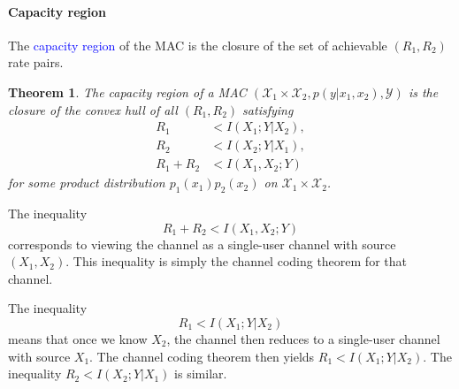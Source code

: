 \documentclass[a4paper, 11pt, openany]{book}
\numberwithin{equation}{section}
\theoremstyle{plain}
\newtheorem{theorem}	[equation]	{Theorem}
\theoremstyle{definition}
\newcommand{\Structure}[1]{\textcolor{blue}{#1}}
\newcommand{\alphabet}[1]{\mathcal{#1}}
\begin{document}
\paragraph{Capacity region}
The \Structure{capacity region} of the MAC is the closure of the set of achievable $(R_1, R_2)$ rate pairs.

\begin{theorem}
The capacity region of a MAC $( \alphabet{X}_1 \times \alphabet{X}_2 , p(y | x_1, x_2), \alphabet{Y} )$ is the closure of the convex hull of all $(R_1, R_2)$ satisfying
\begin{align*}
	R_1 &< I(X_1 ; Y | X_2),\\
	R_2 &< I(X_2 ; Y | X_1),\\
	R_1 + R_2 &< I(X_1, X_2 ; Y)
\end{align*}
for some product distribution $p_1(x_1) p_2(x_2)$ on $\alphabet{X}_1 \times \alphabet{X}_2$.
\end{theorem}


\begin{center}
\end{center}


The inequality
\[
	R_1 + R_2 < I(X_1, X_2 ; Y)
\]
corresponds to viewing the channel as a single-user channel with source $(X_1, X_2)$. This inequality is simply  the channel coding theorem for that channel.

The inequality
\[
	R_1 < I(X_1; Y | X_2)
\]
means that once we know $X_2$, the channel then reduces to a single-user channel with source $X_1$. The channel coding theorem then yields $R_1 < I(X_1; Y | X_2)$. The inequality $R_2 < I(X_2; Y | X_1)$ is similar. 
\end{document}
